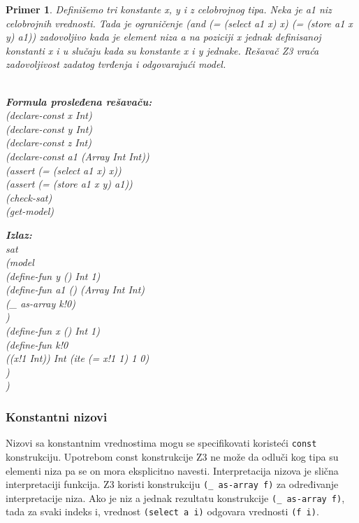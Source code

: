 \documentclass[12pt,oneside]{memoir}
\newcommand\tab[1][0.5cm]{\hspace*{#1}}
\newtheorem{primer}{Primer}
\begin{document}
\begin{primer} Definišemo tri konstante x, y i z celobrojnog tipa. Neka je a1 niz celobrojnih vrednosti. Tada je ograničenje (and (= (select a1 x) x) (= (store a1 x y) a1)) zadovoljivo kada je element niza a na poziciji x jednak definisanoj konstanti x i u slučaju kada su konstante x i y jednake.
Rešavač Z3 vraća zadovoljivost zadatog tvrđenja i odgovarajući model.
 \\ \\
\begin{minipage}[b]{0.45\textwidth}
\textbf{Formula prosleđena rešavaču:}
\\(declare-const x Int)
\\(declare-const y Int)
\\(declare-const z Int)
\\(declare-const a1 (Array Int Int))
\\(assert (= (select a1 x) x))
\\(assert (= (store a1 x y) a1))
\\(check-sat)
\\(get-model)
\end{minipage}
\hspace{1.3cm} 
\begin{minipage}[t]{0.5\textwidth}
\vspace{-5.3cm}
\textbf{Izlaz:}
\\sat
\\(model 
\\\tab(define-fun y () Int 1)
\\\tab(define-fun a1 () (Array Int Int)
\\\tab\tab(\_ as-array k!0)
\\\tab)
\\\tab(define-fun x () Int 1)
\\\tab(define-fun k!0 
\\\tab\tab((x!1 Int)) Int (ite (= x!1 1) 1 0)
\\\tab)
\\)
\end{minipage}
\end{primer} 
 

\subsubsection{Konstantni nizovi}

Nizovi sa konstantnim vrednostima mogu se specifikovati koristeći \texttt{const} konstrukciju. Upotrebom const konstrukcije Z3 ne može da odluči kog tipa su elementi niza pa se on mora eksplicitno navesti. Interpretacija nizova je slična interpretaciji funkcija. Z3 koristi konstrukciju \texttt{(\_ as-array f)} za određivanje interpretacije niza. Ako je niz a jednak rezultatu konstrukcije \texttt{(\_ as-array f)}, tada za svaki indeks i, vrednost \texttt{(select a i)} odgovara vrednosti \texttt{(f i)}. 
\end{document}
